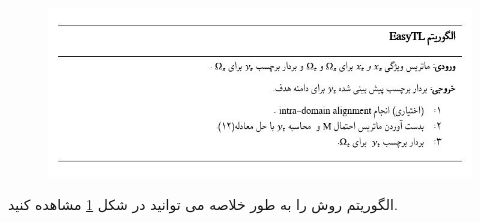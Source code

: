 {{{			\begin{figure}
				\centering
				\includegraphics[scale=0.7]{images/easyTLAlgo.JPG}
				\caption{}
				\label{fig:8}
			\end{figure}
			
			الگوریتم روش 
			را به طور خلاصه می توانید در شکل
			\ref{fig:8}
			مشاهده کنید.
		}
	}

}